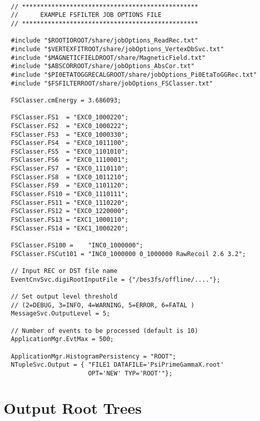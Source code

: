 \documentclass[11pt,a4paper]{define/cepcnote}
\begin{document}
\begin{verbatim}

  // ************************************************
  //      EXAMPLE FSFILTER JOB OPTIONS FILE
  // ************************************************

  #include "$ROOTIOROOT/share/jobOptions_ReadRec.txt"
  #include "$VERTEXFITROOT/share/jobOptions_VertexDbSvc.txt"
  #include "$MAGNETICFIELDROOT/share/MagneticField.txt"
  #include "$ABSCORROOT/share/jobOptions_AbsCor.txt"
  #include "$PI0ETATOGGRECALGROOT/share/jobOptions_Pi0EtaToGGRec.txt"
  #include "$FSFILTERROOT/share/jobOptions_FSClasser.txt"

  FSClasser.cmEnergy = 3.686093;

  FSClasser.FS1  = "EXC0_1000220";
  FSClasser.FS2  = "EXC0_1000222";
  FSClasser.FS3  = "EXC0_1000330";
  FSClasser.FS4  = "EXC0_1011100";
  FSClasser.FS5  = "EXC0_1101010";
  FSClasser.FS6  = "EXC0_1110001";
  FSClasser.FS7  = "EXC0_1110110";
  FSClasser.FS8  = "EXC0_1011210";
  FSClasser.FS9  = "EXC0_1101120";
  FSClasser.FS10 = "EXC0_1110111";
  FSClasser.FS11 = "EXC0_1110220";
  FSClasser.FS12 = "EXC0_1220000";
  FSClasser.FS13 = "EXC1_1000110";
  FSClasser.FS14 = "EXC1_1000220";

  FSClasser.FS100 =    "INC0_1000000";
  FSClasser.FSCut101 = "INC0_1000000 0_1000000 RawRecoil 2.6 3.2";

  // Input REC or DST file name 
  EventCnvSvc.digiRootInputFile = {"/bes3fs/offline/...."};

  // Set output level threshold 
  // (2=DEBUG, 3=INFO, 4=WARNING, 5=ERROR, 6=FATAL )
  MessageSvc.OutputLevel = 5;

  // Number of events to be processed (default is 10)
  ApplicationMgr.EvtMax = 500;

  ApplicationMgr.HistogramPersistency = "ROOT";
  NTupleSvc.Output = { "FILE1 DATAFILE='PsiPrimeGammaX.root' 
                       OPT='NEW' TYP='ROOT'"};
\end{verbatim}


\section{Output Root Trees}
\label{sec:tree}
\end{document}
